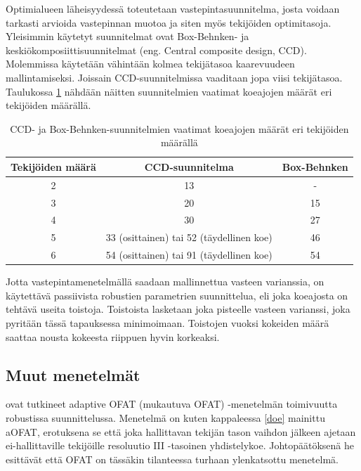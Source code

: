 \documentclass[12pt,a4paper,finnish]{tutthesis}
\begin{document}
Optimialueen läheisyydessä toteutetaan vastepintasuunnitelma, josta voidaan
tarkasti arvioida vastepinnan muotoa ja siten myös tekijöiden optimitasoja.
Yleisimmin käytetyt suunnitelmat ovat Box-Behnken- ja keskiökomposiittisuunnitelmat
(eng. Central composite design, CCD). Molemmissa käytetään vähintään kolmea
tekijätasoa kaarevuudeen mallintamiseksi. Joissain CCD-suunnitelmissa vaaditaan
jopa viisi tekijätasoa. Taulukossa \ref{vpsuunnitelmat} nähdään näitten suunnitelmien vaatimat
koeajojen määrät eri tekijöiden määrällä.

\begin{table}[]
\centering
\caption{CCD- ja Box-Behnken-suunnitelmien vaatimat koeajojen määrät eri tekijöiden määrällä \parencite{ehandbook}}
\label{vpsuunnitelmat}
\begin{tabular}{ccc}
\hline
\textbf{Tekijöiden määrä} & \textbf{CCD-suunnitelma}                 & \textbf{Box-Behnken} \\ \hline
2                         & 13                                       & -                    \\
3                         & 20                                       & 15                   \\
4                         & 30                                       & 27                   \\
5                         & 33 (osittainen) tai 52 (täydellinen koe) & 46                   \\
6                         & 54 (osittainen) tai 91 (täydellinen koe) & 54                  
\end{tabular}
\end{table}

Jotta vastepintamenetelmällä saadaan mallinnettua vasteen varianssia, on käytettävä
passiivista robustien parametrien suunnittelua, eli
joka koeajosta on tehtävä useita toistoja. Toistoista lasketaan joka pisteelle vasteen
varianssi, joka pyritään tässä tapauksessa minimoimaan. Toistojen vuoksi
kokeiden määrä saattaa nousta kokeesta riippuen hyvin korkeaksi.


\subsection{Muut menetelmät}

\textcite{frey2008adaptive} ovat tutkineet adaptive OFAT (mukautuva OFAT) -menetelmän
toimivuutta robustissa suunnittelussa. Menetelmä on kuten kappaleessa \ref{doe} mainittu
aOFAT, erotuksena se että joka hallittavan tekijän tason vaihdon
jälkeen ajetaan ei-hallittaville tekijöille resoluutio III -tasoinen
yhdistelykoe. Johtopäätöksenä he esittävät että OFAT on tässäkin tilanteessa
turhaan ylenkatsottu menetelmä.
\end{document}
